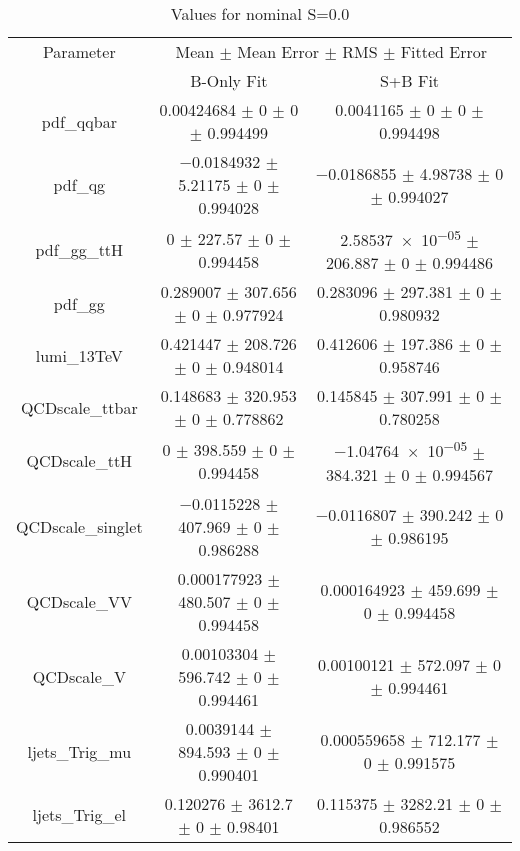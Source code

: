 \begin{table}
\centering
\caption{Values for nominal S=0.0}
\begin{tabular}{ccc}
\toprule
Parameter & \multicolumn{2}{c}{Mean $\pm$ Mean Error $\pm$ RMS $\pm$ Fitted Error}\\
 & B-Only Fit & S+B Fit\\
\midrule
pdf\_qqbar & \num{0.00424684} $\pm$ \num{0} $\pm$ \num{0} $\pm$ \num{0.994499} & \num{0.0041165} $\pm$ \num{0} $\pm$ \num{0} $\pm$ \num{0.994498}\\
pdf\_qg & \num{-0.0184932} $\pm$ \num{5.21175} $\pm$ \num{0} $\pm$ \num{0.994028} & \num{-0.0186855} $\pm$ \num{4.98738} $\pm$ \num{0} $\pm$ \num{0.994027}\\
pdf\_gg\_ttH & \num{0} $\pm$ \num{227.57} $\pm$ \num{0} $\pm$ \num{0.994458} & \num{2.58537e-05} $\pm$ \num{206.887} $\pm$ \num{0} $\pm$ \num{0.994486}\\
pdf\_gg & \num{0.289007} $\pm$ \num{307.656} $\pm$ \num{0} $\pm$ \num{0.977924} & \num{0.283096} $\pm$ \num{297.381} $\pm$ \num{0} $\pm$ \num{0.980932}\\
lumi\_13TeV & \num{0.421447} $\pm$ \num{208.726} $\pm$ \num{0} $\pm$ \num{0.948014} & \num{0.412606} $\pm$ \num{197.386} $\pm$ \num{0} $\pm$ \num{0.958746}\\
QCDscale\_ttbar & \num{0.148683} $\pm$ \num{320.953} $\pm$ \num{0} $\pm$ \num{0.778862} & \num{0.145845} $\pm$ \num{307.991} $\pm$ \num{0} $\pm$ \num{0.780258}\\
QCDscale\_ttH & \num{0} $\pm$ \num{398.559} $\pm$ \num{0} $\pm$ \num{0.994458} & \num{-1.04764e-05} $\pm$ \num{384.321} $\pm$ \num{0} $\pm$ \num{0.994567}\\
QCDscale\_singlet & \num{-0.0115228} $\pm$ \num{407.969} $\pm$ \num{0} $\pm$ \num{0.986288} & \num{-0.0116807} $\pm$ \num{390.242} $\pm$ \num{0} $\pm$ \num{0.986195}\\
QCDscale\_VV & \num{0.000177923} $\pm$ \num{480.507} $\pm$ \num{0} $\pm$ \num{0.994458} & \num{0.000164923} $\pm$ \num{459.699} $\pm$ \num{0} $\pm$ \num{0.994458}\\
QCDscale\_V & \num{0.00103304} $\pm$ \num{596.742} $\pm$ \num{0} $\pm$ \num{0.994461} & \num{0.00100121} $\pm$ \num{572.097} $\pm$ \num{0} $\pm$ \num{0.994461}\\
ljets\_Trig\_mu & \num{0.0039144} $\pm$ \num{894.593} $\pm$ \num{0} $\pm$ \num{0.990401} & \num{0.000559658} $\pm$ \num{712.177} $\pm$ \num{0} $\pm$ \num{0.991575}\\
ljets\_Trig\_el & \num{0.120276} $\pm$ \num{3612.7} $\pm$ \num{0} $\pm$ \num{0.98401} & \num{0.115375} $\pm$ \num{3282.21} $\pm$ \num{0} $\pm$ \num{0.986552}\\

\end{tabular}
\end{table}

